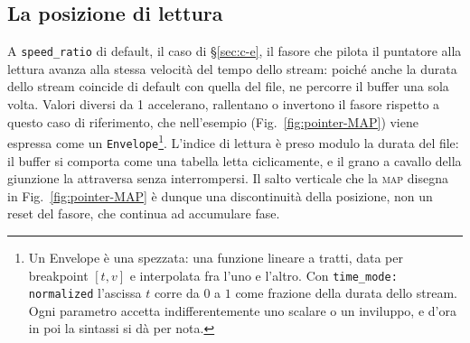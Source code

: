 \newcommand{\notaEnvelope}{\footnote{Un Envelope è una spezzata:
una funzione lineare a tratti, data per breakpoint $[t, v]$ e
interpolata fra l'uno e l'altro. Con \texttt{time\_mode: normalized}
l'ascissa $t$ corre da $0$ a $1$ come frazione
della durata dello stream. Ogni parametro accetta indifferentemente uno scalare
o un inviluppo, e d'ora in poi la sintassi si dà per nota.}}

\subsection{La posizione di lettura}\label{sec:pointer}

A \texttt{speed\_ratio} di default, il caso di \S\ref{sec:c-e}, il fasore
che pilota il puntatore alla lettura avanza alla stessa velocità del tempo
dello stream: poiché anche la durata dello stream coincide di default con
quella del file, ne percorre il buffer una sola volta. Valori diversi da 1
accelerano, rallentano o invertono il fasore rispetto a questo caso di
riferimento, che nell'esempio (Fig.~\ref{fig:pointer-MAP}) viene espressa
come un \texttt{Envelope}\notaEnvelope.
L'indice di lettura è preso modulo la durata del file: il buffer si comporta
come una tabella letta ciclicamente, e il grano a cavallo della giunzione la
attraversa senza interrompersi. Il salto verticale che la \textsc{map} disegna
in Fig.~\ref{fig:pointer-MAP} è dunque una discontinuità della posizione, non
un reset del fasore, che continua ad accumulare fase.


